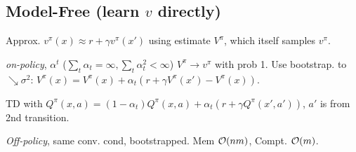 
\subsection{Model-Free (learn \(v\) directly)}

\begin{definition}[Bootstrapping]
    Approx. \(v^\pi(x) \approx r + \gamma v^\pi(x')\) using estimate \(V^\pi\), which itself samples \(v^\pi\).
\end{definition}

\begin{definition}[TD-learning]
    \textit{on-policy}, \(\alpha^t\) (\(\sum_t \alpha_t = \infty, \sum_t \alpha_t^2 < \infty\)) \(V^\pi \to v^\pi\) with prob 1.
    Use bootstrap. to \(\searrow \sigma^2\):
    \(V^\pi(x) = V^\pi(x) + \alpha_t(r + \gamma V^\pi(x') - V^\pi(x))\).
\end{definition}

\begin{definition}[SARSA]
    TD with \(Q^\pi(x, a) = (1 - \alpha_t) Q^\pi(x, a) + \alpha_t(r + \gamma Q^\pi(x', a'))\),
    \(a'\) is from 2nd transition.
\end{definition}

\begin{definition}[Q-learning]
    \textit{Off-policy}, same conv. cond, bootstrapped. Mem \(\mathcal{O}(nm)\), Compt. \(\mathcal{O}(m)\).\\
\end{definition}
